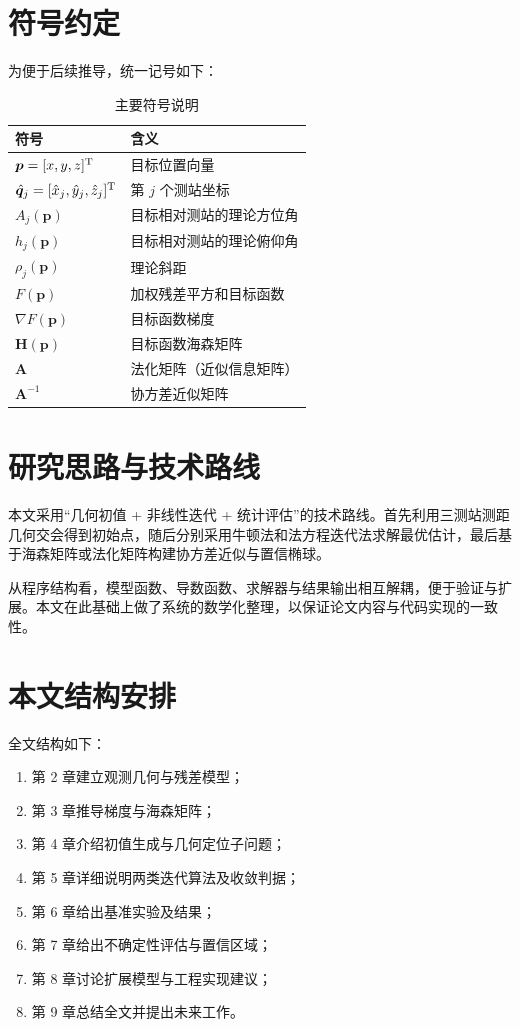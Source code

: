 \section{符号约定}
为便于后续推导，统一记号如下：
\begin{table}[H]
\centering
\caption{主要符号说明}
\begin{tabular}{ll}
\toprule
符号 & 含义 \\
\midrule
$\bm p=[x,y,z]^{\mathrm{T}}$ & 目标位置向量 \\
$\hat{\bm q}_j=[\hat{x}_j,\hat{y}_j,\hat{z}_j]^{\mathrm{T}}$ & 第 $j$ 个测站坐标 \\
$A_j(\bm p)$ & 目标相对测站的理论方位角 \\
$h_j(\bm p)$ & 目标相对测站的理论俯仰角 \\
$\rho_j(\bm p)$ & 理论斜距 \\
$F(\bm p)$ & 加权残差平方和目标函数 \\
$\nabla F(\bm p)$ & 目标函数梯度 \\
$\bm H(\bm p)$ & 目标函数海森矩阵 \\
$\bm A$ & 法化矩阵（近似信息矩阵） \\
$\bm A^{-1}$ & 协方差近似矩阵 \\
\bottomrule
\end{tabular}
\end{table}

\section{研究思路与技术路线}
本文采用“几何初值 + 非线性迭代 + 统计评估”的技术路线。首先利用三测站测距几何交会得到初始点，随后分别采用牛顿法和法方程迭代法求解最优估计，最后基于海森矩阵或法化矩阵构建协方差近似与置信椭球。

从程序结构看，模型函数、导数函数、求解器与结果输出相互解耦，便于验证与扩展。本文在此基础上做了系统的数学化整理，以保证论文内容与代码实现的一致性。

\section{本文结构安排}
全文结构如下：
\begin{enumerate}
  \item 第 2 章建立观测几何与残差模型；
  \item 第 3 章推导梯度与海森矩阵；
  \item 第 4 章介绍初值生成与几何定位子问题；
  \item 第 5 章详细说明两类迭代算法及收敛判据；
  \item 第 6 章给出基准实验及结果；
  \item 第 7 章给出不确定性评估与置信区域；
  \item 第 8 章讨论扩展模型与工程实现建议；
  \item 第 9 章总结全文并提出未来工作。
\end{enumerate}

